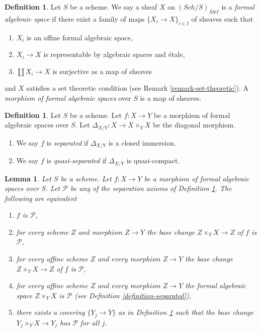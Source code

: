 \documentclass{stacks-project}
\theoremstyle{plain}
\newtheorem{lemma}[subsection]{Lemma}
\theoremstyle{definition}
\newtheorem{definition}[subsection]{Definition}
\theoremstyle{remark}
\numberwithin{equation}{subsection}
\def\Sch{\mathit{Sch}}
\begin{document}
\begin{definition}
\label{definition-formal-algebraic-space}
Let $S$ be a scheme. We say a sheaf $X$ on $(\Sch/S)_{fppf}$ is a
{\it formal algebraic space} if there exist a family of maps
$\{X_i \to X\}_{i \in I}$ of sheaves such that
\begin{enumerate}
\item $X_i$ is an affine formal algebraic space,
\item $X_i \to X$ is representable by algebraic spaces and \'etale,
\item $\coprod X_i \to X$ is surjective as a map of sheaves
\end{enumerate}
and $X$ satisfies a set theoretic condition
(see Remark \ref{remark-set-theoretic}). A
{\it morphism of formal algebraic spaces}
over $S$ is a map of sheaves.
\end{definition}

\begin{definition}
\label{definition-separated-morphism}
Let $S$ be a scheme.
Let $f : X \to Y$ be a morphism of formal algebraic spaces over $S$.
Let $\Delta_{X/Y} : X \to X \times_Y X$ be the diagonal morphism.
\begin{enumerate}
\item We say $f$ is {\it separated} if $\Delta_{X/Y}$ is a closed immersion.
\item We say $f$ is {\it quasi-separated} if $\Delta_{X/Y}$ is quasi-compact.
\end{enumerate}
\end{definition}

\begin{lemma}
\label{lemma-separated-local}
Let $S$ be a scheme. Let $f : X \to Y$ be a morphism of formal algebraic spaces
over $S$. Let $\mathcal{P}$ be any of the separation axioms of
Definition \ref{definition-separated-morphism}.
The following are equivalent
\begin{enumerate}
\item $f$ is $\mathcal{P}$,
\item for every scheme $Z$ and morphism $Z \to Y$ the
base change $Z \times_Y X \to Z$ of $f$ is $\mathcal{P}$,
\item for every affine scheme $Z$ and every morphism $Z \to Y$ the
base change $Z \times_Y X \to Z$ of $f$ is $\mathcal{P}$,
\item for every affine scheme $Z$ and every morphism $Z \to Y$ the
formal algebraic space $Z \times_Y X$ is $\mathcal{P}$ (see
Definition \ref{definition-separated}),
\item there exists a covering $\{Y_j \to Y\}$ as in
Definition \ref{definition-formal-algebraic-space}
such that the base change $Y_j \times_Y X \to Y_j$ has
$\mathcal{P}$ for all $j$.
\end{enumerate}
\end{lemma}
\end{document}
